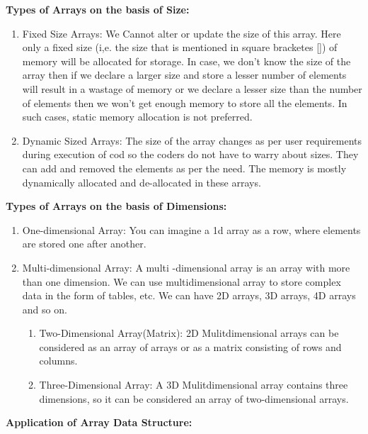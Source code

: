 \textbf{Types of Arrays on the basis of Size:}

\begin{enumerate}
    \item Fixed Size Arrays:
        We Cannot alter or update the size of this array. Here only a
        fixed size (i,e. the size that is mentioned in square bracketes
        []) of memory will be allocated for storage. In case, we don't
        know the size of the array then if we declare a larger size and
        store a lesser number of elements will result in a wastage of
        memory or we declare a lesser size than the number of elements
        then we won't get enough memory to store all the elements. In
        such cases, static memory allocation is not preferred.
    \item Dynamic Sized Arrays:
        The size of the array changes as per user requirements during
        execution of cod so the coders do not have to warry about sizes.
        They can add and removed the elements as per the need. The
        memory is mostly dynamically allocated and de-allocated in these
        arrays.
\end{enumerate}

\textbf{Types of Arrays on the basis of Dimensions:}

\begin{enumerate}
    \item One-dimensional Array: You can imagine a 1d array as a row,
        where elements are stored one after another.
    \item Multi-dimensional Array: A multi -dimensional array is an
        array with more than one dimension. We can use multidimensional
        array to store complex data in the form of tables, etc. We can
        have 2D arrays, 3D arrays, 4D arrays and so on.
        \begin{enumerate}
            \item Two-Dimensional Array(Matrix): 2D Mulitdimensional
                arrays can be considered as an array of arrays or as a
                matrix consisting of rows and columns.
            \item Three-Dimensional Array: A 3D Mulitdimensional array
                contains three dimensions, so it can be considered an
                array of two-dimensional arrays.
        \end{enumerate}
\end{enumerate}

\textbf{Application of Array Data Structure:}

